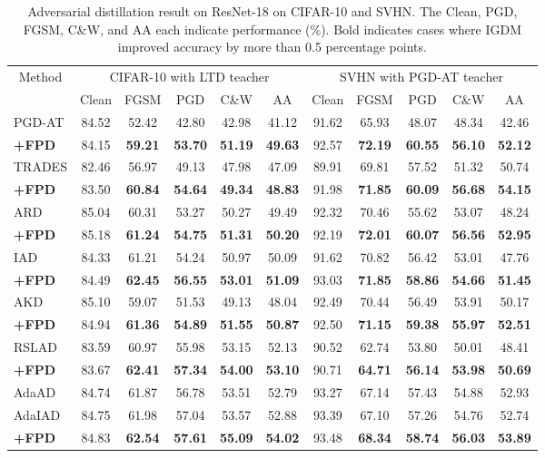 \documentclass{article} %
\begin{document}
\begin{table}[t]
 \centering
 \caption{Adversarial distillation result on ResNet-18 on CIFAR-10 and SVHN. The Clean, PGD, FGSM, C\&W, and AA each indicate performance (\%). Bold indicates cases where IGDM improved accuracy by more than 0.5 percentage points.}
 \setlength{\tabcolsep}{5.5pt}
 \begin{tabular}{lcccccccccc}
 \toprule
   \multicolumn{1}{c}{\multirow{2.5}{*}{Method}}& \multicolumn{5}{c}{CIFAR-10 with LTD teacher}& \multicolumn{5}{c}{SVHN with PGD-AT teacher} \\
   \cmidrule(r){2-6}
   \cmidrule(r){7-11}
   & Clean & FGSM & PGD & C\&W & AA & Clean & FGSM & PGD & C\&W & AA \\
\midrule PGD-AT  & 84.52 & 52.42& 42.80 & 42.98& 41.12 & 91.62& 65.93& 48.07& 48.34 & 42.46\\
 \textbf{+FPD} & 84.15 & \textbf{59.21}& \textbf{53.70} & \textbf{51.19}& \textbf{49.63} & {92.57}& \textbf{72.19}& \textbf{60.55}& \textbf{56.10} & \textbf{52.12}\\
\midrule TRADES  & 82.46 & 56.97& 49.13 & 47.98& 47.09 & 89.91& 69.81& 57.52& 51.32 & 50.74\\
 \textbf{+FPD} & 83.50 & \textbf{60.84}& \textbf{54.64} &\textbf{49.34}& \textbf{48.83} &{91.98}& \textbf{71.85}& \textbf{60.09}& \textbf{56.68} & \textbf{54.15}\\
\midrule
 ARD & 85.04 & 60.31& 53.27 & 50.27& 49.49 & 92.32 & 70.46& 55.62 & 53.07 & 48.24\\
 \textbf{+FPD} & 85.18 & \textbf{61.24}& \textbf{54.75} & \textbf{51.31}& \textbf{50.20} & 92.19& \textbf{72.01}& \textbf{60.07}& \textbf{56.56} & \textbf{52.95}\\
 \midrule
 IAD & 84.33 & 61.21& 54.24 & 50.97& 50.09 & 91.62& 70.82& 56.42& 53.01 & 47.76\\
 \textbf{+FPD} & 84.49 & \textbf{62.45}& \textbf{56.55} & \textbf{53.01}& \textbf{51.09} & {93.03}& \textbf{71.85}& \textbf{58.86}& \textbf{54.66} &\textbf{51.45}\\
 \midrule
 AKD & 85.10& 59.07& 51.53& 49.13& 48.04& 92.49& 70.44& 56.49& 53.91  & 50.17\\
 \textbf{+FPD} & 84.94& \textbf{61.36}& \textbf{54.89}& \textbf{51.55}& \textbf{50.87}& 92.50& \textbf{71.15}& \textbf{59.38}& \textbf{55.97} & \textbf{52.51}\\
 \midrule
 RSLAD & 83.59 & 60.97& 55.98 & 53.15 & 52.13 & 90.52& 62.74& 53.80& 50.01 & 48.41\\
 \textbf{+FPD} & 83.67 & \textbf{62.41}& \textbf{57.34} & \textbf{54.00}  & \textbf{53.10} & 90.71& \textbf{64.71}& \textbf{56.14}& \textbf{53.98} & \textbf{50.69}\\
 \midrule
 AdaAD & 84.74& 61.87& 56.78 & 53.51& 52.79 & 93.27 & 67.14& 57.43 & 54.88 & 52.93\\
 AdaIAD & 84.75& 61.98& 57.04& 53.57& 52.88& 93.39& 67.10& 57.26& 54.76 & 52.74\\
 \textbf{+FPD} & 84.83 & \textbf{62.54} & \textbf{57.61} & \textbf{55.09} & \textbf{54.02} & 93.48 & \textbf{68.34}& \textbf{58.74} & \textbf{56.03} & \textbf{53.89} \\


\end{tabular}
\end{table}
\end{document}
